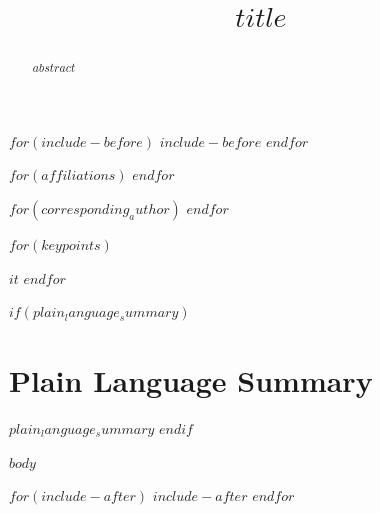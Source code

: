 \documentclass[$if(classoption)$$classoption$$else$draft,linenumbers$endif$]{agujournal2019}
\begin{document}
$for(include-before)$
$include-before$
$endfor$

\title{$title$}


$for(affiliations)$
$endfor$

$for(corresponding_author)$
$endfor$

\begin{keypoints}
$for(keypoints)$
\item $it$
$endfor$
\end{keypoints}

\begin{abstract}
$abstract$
\end{abstract}

$if(plain_language_summary)$
\section*{Plain Language Summary}
$plain_language_summary$
$endif$

$body$

$for(include-after)$
$include-after$
$endfor$
\end{document}
